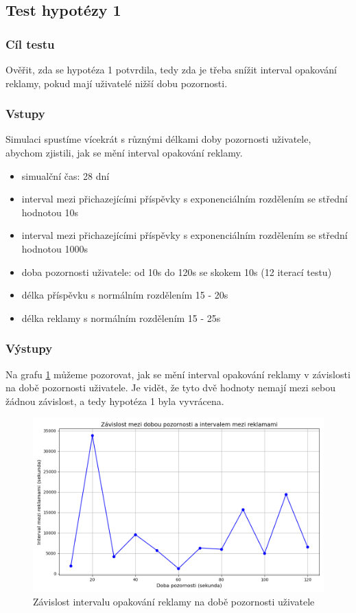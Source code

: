 \documentclass[11pt, a4paper]{article}
\begin{document}
\subsection{Test hypotézy 1}

\subsubsection{Cíl testu}
Ověřit, zda se hypotéza 1 potvrdila, tedy zda je třeba snížit interval opakování reklamy, pokud mají uživatelé nižší dobu pozornosti.
\subsubsection{Vstupy}
Simulaci spustíme vícekrát s různými délkami doby pozornosti uživatele, abychom zjistili, jak se mění interval opakování reklamy.
\begin{itemize}
    \item simualční čas: 28 dní
    \item interval mezi přichazejícími příspěvky s exponenciálním rozdělením se střední hodnotou 10s
    \item interval mezi přichazejícími příspěvky s exponenciálním rozdělením se střední hodnotou 1000s
    \item doba pozornosti uživatele: od 10s do 120s se skokem 10s (12 iterací testu)
    \item délka příspěvku s normálním rozdělením 15 - 20s
    \item délka reklamy s normálním rozdělením 15 - 25s
\end{itemize}

\subsubsection{Výstupy}

Na grafu \ref{fig:attention_time_vs_ad_interval} můžeme pozorovat, jak se mění interval opakování reklamy v závislosti na době pozornosti uživatele.
Je vidět, že tyto dvě hodnoty nemají mezi sebou žádnou závislost, a tedy hypotéza 1 byla vyvrácena.
\begin{figure}[h]
    \centering
    \includegraphics[width=\linewidth]{attention_time_vs_ad_interval.png}
    \caption{Závislost intervalu opakování reklamy na době pozornosti uživatele}
    \label{fig:attention_time_vs_ad_interval}
\end{figure}
\end{document}
